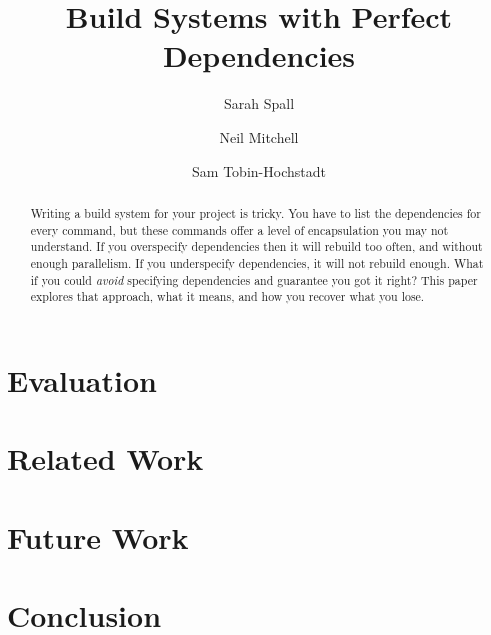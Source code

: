 \documentclass[acmsmall]{acmart}
\begin{document}
\title{Build Systems with Perfect Dependencies}

\author{Sarah Spall}

\author{Neil Mitchell}

\author{Sam Tobin-Hochstadt}

\begin{abstract}
Writing a build system for your project is tricky. You have to list the dependencies for every command, but these commands offer a level of encapsulation you may not understand. If you overspecify dependencies then it will rebuild too often, and without enough parallelism. If you underspecify dependencies, it will not rebuild enough. What if you could \emph{avoid} specifying dependencies and guarantee you got it right? This paper explores that approach, what it means, and how you recover what you lose.
\end{abstract}

\maketitle





\section{Evaluation}

\section{Related Work}

\section{Future Work}

\section{Conclusion}
\end{document}

